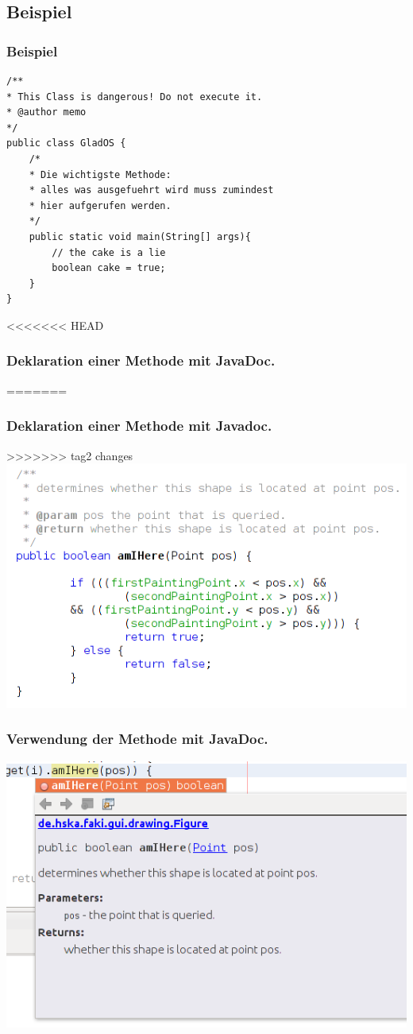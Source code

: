 \documentclass[final]{beamer}
\begin{document}
\subsection{Beispiel}
\begin{frame}[containsverbatim]
\frametitle{Beispiel}
	\begin{lstlisting}
/**
* This Class is dangerous! Do not execute it.
* @author memo
*/
public class GladOS {
	/*
	* Die wichtigste Methode: 
	* alles was ausgefuehrt wird muss zumindest 
	* hier aufgerufen werden.
	*/
	public static void main(String[] args){
		// the cake is a lie
		boolean cake = true;
	}
}

	\end{lstlisting}
\end{frame}

\begin{frame}
<<<<<<< HEAD
	\frametitle{Deklaration einer Methode mit JavaDoc.}
=======
	\frametitle{Deklaration einer Methode mit Javadoc.}
>>>>>>> tag2 changes
	\includegraphics[scale=0.5]{JavaDoc_example_1_1.png}
\end{frame}

\begin{frame}
	\frametitle{Verwendung der Methode mit JavaDoc.}
	\includegraphics[scale=0.5]{JavaDoc_example_2_1.png}
\end{frame}
\end{document}
